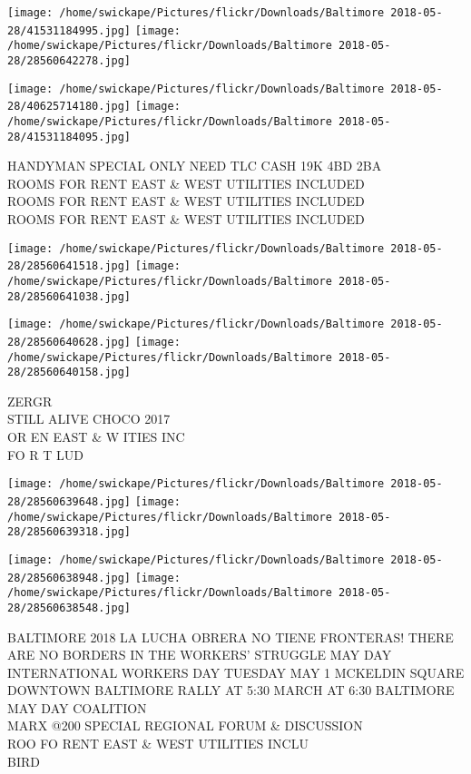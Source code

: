 \documentclass[10pt,letterpaper]{article}
\begin{document}
\texttt{[image: /home/swickape/Pictures/flickr/Downloads/Baltimore 2018-05-28/41531184995.jpg]}
\texttt{[image: /home/swickape/Pictures/flickr/Downloads/Baltimore 2018-05-28/28560642278.jpg]}

\texttt{[image: /home/swickape/Pictures/flickr/Downloads/Baltimore 2018-05-28/40625714180.jpg]}
\texttt{[image: /home/swickape/Pictures/flickr/Downloads/Baltimore 2018-05-28/41531184095.jpg]}

HANDYMAN SPECIAL ONLY NEED TLC CASH 19K 4BD 2BA\\
ROOMS FOR RENT EAST \& WEST UTILITIES INCLUDED\\
ROOMS FOR RENT EAST \& WEST UTILITIES INCLUDED\\
ROOMS FOR RENT EAST \& WEST UTILITIES INCLUDED\\
\pagebreak

\texttt{[image: /home/swickape/Pictures/flickr/Downloads/Baltimore 2018-05-28/28560641518.jpg]}
\texttt{[image: /home/swickape/Pictures/flickr/Downloads/Baltimore 2018-05-28/28560641038.jpg]}

\texttt{[image: /home/swickape/Pictures/flickr/Downloads/Baltimore 2018-05-28/28560640628.jpg]}
\texttt{[image: /home/swickape/Pictures/flickr/Downloads/Baltimore 2018-05-28/28560640158.jpg]}

ZERGR\\
STILL ALIVE CHOCO 2017\\
OR EN EAST \& W ITIES INC\\
FO R T LUD\\
\pagebreak

\texttt{[image: /home/swickape/Pictures/flickr/Downloads/Baltimore 2018-05-28/28560639648.jpg]}
\texttt{[image: /home/swickape/Pictures/flickr/Downloads/Baltimore 2018-05-28/28560639318.jpg]}

\texttt{[image: /home/swickape/Pictures/flickr/Downloads/Baltimore 2018-05-28/28560638948.jpg]}
\texttt{[image: /home/swickape/Pictures/flickr/Downloads/Baltimore 2018-05-28/28560638548.jpg]}

BALTIMORE 2018 LA LUCHA OBRERA NO TIENE FRONTERAS!  THERE ARE NO BORDERS IN THE WORKERS' STRUGGLE MAY DAY INTERNATIONAL WORKERS DAY TUESDAY MAY 1 MCKELDIN SQUARE DOWNTOWN BALTIMORE RALLY AT 5:30 MARCH AT 6:30 BALTIMORE MAY DAY COALITION\\
MARX @200 SPECIAL REGIONAL FORUM \& DISCUSSION\\
ROO FO RENT EAST \& WEST UTILITIES INCLU\\
BIRD\\
\pagebreak
\end{document}
